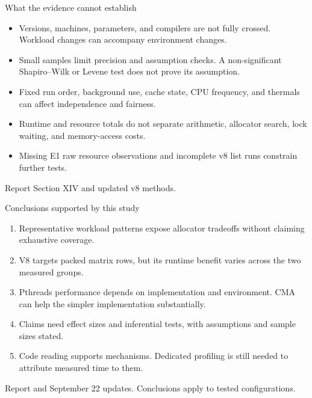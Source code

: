 \documentclass[aspectratio=169,11pt]{beamer}
\newcommand{\source}[1]{\par\vfill{\tiny\color{gray}#1\par}}
\begin{document}
\begin{frame}{What the evidence cannot establish}
\begin{itemize}
\item Versions, machines, parameters, and compilers are not fully crossed. Workload changes can accompany environment changes.
\item Small samples limit precision and assumption checks. A non-significant Shapiro--Wilk or Levene test does not prove its assumption.
\item Fixed run order, background use, cache state, CPU frequency, and thermals can affect independence and fairness.
\item Runtime and resource totals do not separate arithmetic, allocator search, lock waiting, and memory-access costs.
\item Missing E1 raw resource observations and incomplete v8 list runs constrain further tests.
\end{itemize}
\source{Report Section XIV and updated v8 methods.}
\end{frame}


\begin{frame}{Conclusions supported by this study}
\begin{enumerate}
\item Representative workload patterns expose allocator tradeoffs without claiming exhaustive coverage.
\item V8 targets packed matrix rows, but its runtime benefit varies across the two measured groups.
\item Pthreads performance depends on implementation and environment. CMA can help the simpler implementation substantially.
\item Claims need effect sizes and inferential tests, with assumptions and sample sizes stated.
\item Code reading supports mechanisms. Dedicated profiling is still needed to attribute measured time to them.
\end{enumerate}
\source{Report and September 22 updates. Conclusions apply to tested configurations.}
\end{frame}


\appendix
\end{document}
